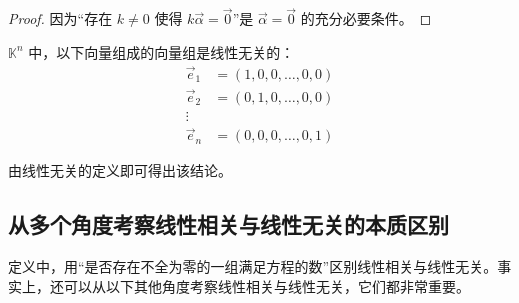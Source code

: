 \begin{proof}
	因为“存在 $k \ne 0$ 使得 $k \vec \alpha = \vec 0$”是 $\vec \alpha = \vec 0$ 的充分必要条件。
\end{proof}

\begin{theorem}
	$\mathbb K^n$ 中，以下向量组成的向量组是线性无关的：
	$$
	\begin{aligned}
		\vec e_1 &= (1, 0, 0, \ldots, 0, 0)
		\\
		\vec e_2 &= (0, 1, 0, \ldots, 0, 0)
		\\
		\vdots
		\\
		\vec e_n &= (0, 0, 0, \ldots, 0, 1)
	\end{aligned}
	$$
\end{theorem}

由线性无关的定义即可得出该结论。

\subsection{从多个角度考察线性相关与线性无关的本质区别}

定义中，用“是否存在不全为零的一组满足方程的数”区别线性相关与线性无关。事实上，还可以从以下其他角度考察线性相关与线性无关，它们都非常重要。

